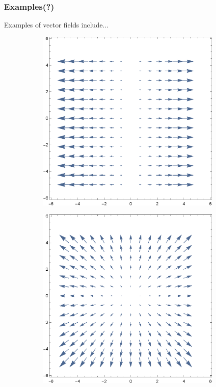 \subsubsection{Examples(?)}
Examples of vector fields include...

\begin{figure}[h!]
\centering
\begin{subfigure}[b]{0.45\textwidth}
\includegraphics[scale=0.45]{fig/chp2-fig1-a}
\end{subfigure}%
\begin{subfigure}[b]{0.45\textwidth}
\includegraphics[scale=0.45]{fig/chp2-fig1-b}
\end{subfigure}%


\end{figure}
